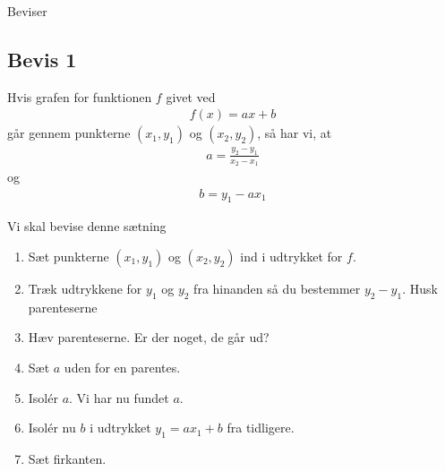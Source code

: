 \begin{center}
\Huge
	Beviser
\end{center}

\subsection*{Bevis 1}
\begin{setn}
	Hvis grafen for funktionen $f$ givet ved
	\begin{align*}
		f(x) = ax+b
	\end{align*}	 
	går gennem punkterne $(x_1,y_1)$ og $(x_2,y_2)$, så har vi, at 
	\begin{align*}
		a = \frac{y_2-y_1}{x_2-x_1}
	\end{align*}
	og
	\begin{align*}
		b = y_1 - ax_1
	\end{align*}
\end{setn}
Vi skal bevise denne sætning
\begin{enumerate}[label=\roman*)]
	\item Sæt punkterne $(x_1,y_1)$ og $(x_2,y_2)$ ind i udtrykket for $f$. 
	\item Træk udtrykkene for $y_1$ og $y_2$ fra hinanden så du bestemmer $y_2 - y_1$. Husk parenteserne
	\item Hæv parenteserne. Er der noget, de går ud?
	\item Sæt $a$ uden for en parentes.
	\item Isolér $a$. Vi har nu fundet $a$. 
	\item Isolér nu $b$ i udtrykket $y_1 = ax_1 + b$ fra tidligere.
	\item Sæt firkanten.
\end{enumerate}

\newpage

